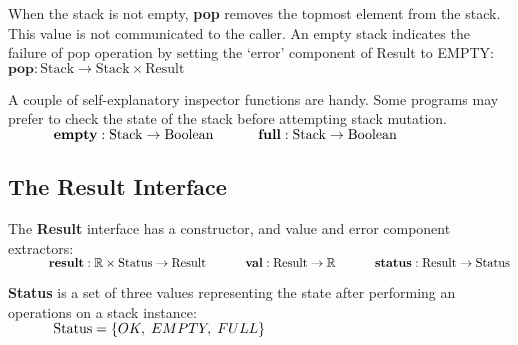 \documentclass[10pt]{article}
\begin{document}
  When the stack is not empty, {\textbf{pop}} removes the topmost element from the stack. This value is not communicated to the caller. An empty stack indicates the failure of pop operation by setting the `error' component of Result to EMPTY:
  \vspace*{6pt}\\\hspace*{32pt}\(
  \textbf{pop}: \mathrm{Stack} \rightarrow \mathrm{Stack \times Result}
  \)\vspace*{6pt}

  A couple of self-explanatory inspector functions are handy. Some programs may prefer to check the state of the stack before attempting stack mutation.
  \vspace*{6pt}\\\(
  \hspace*{32pt}\textbf{empty}: \mathrm{Stack} \rightarrow \mathrm{Boolean}\vspace*{4pt}\\
  \hspace*{32pt}\textbf{full}: \mathrm{Stack} \rightarrow \mathrm{Boolean}
  \)\vspace*{6pt}

\subsection{The Result Interface}
  The \textbf{Result} interface has a constructor, and value and error component extractors:
  \vspace*{6pt}\\\(
  \hspace*{32pt}\textbf{result}: \mathbb{R} \times \mathrm{Status} \rightarrow \mathrm{Result}\vspace*{4pt}\\
  \hspace*{32pt}\textbf{val}: \mathrm{Result} \rightarrow \mathbb{R}\vspace*{4pt}\\
  \hspace*{32pt}\textbf{status}: \mathrm{Result} \rightarrow \mathrm{Status}
  \)\vspace*{6pt}  
  
  \textbf{Status} is a set of three values representing the state after performing an operations on a stack instance: 
   \vspace*{6pt}\\\(\hspace*{32pt}\mathrm{Status} = \{OK, \; EMPTY, \; FULL\} \)
\end{document}
